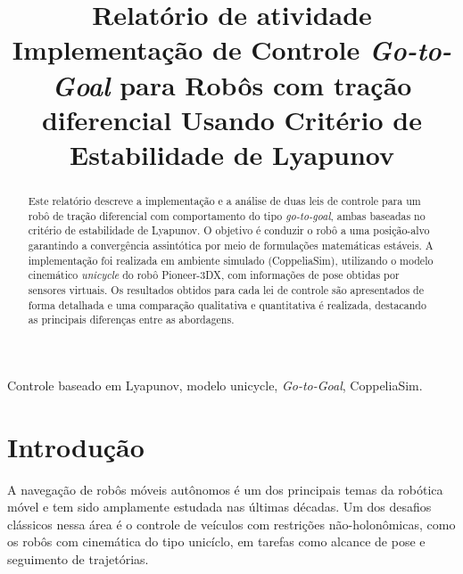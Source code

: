 \documentclass[conference]{IEEEtran}
\begin{document}
\title{Relatório de atividade\\ Implementação de Controle \textit{Go-to-Goal} para Robôs com tração diferencial Usando Critério de Estabilidade de Lyapunov }

\author{
}

\maketitle

\begin{abstract}
Este relatório descreve a implementação e a análise de duas leis de controle para um robô de tração diferencial com comportamento do tipo \textit{go-to-goal}, ambas baseadas no critério de estabilidade de Lyapunov. O objetivo é conduzir o robô a uma posição-alvo garantindo a convergência assintótica por meio de formulações matemáticas estáveis. A implementação foi realizada em ambiente simulado (CoppeliaSim), utilizando o modelo cinemático \textit{unicycle} do robô Pioneer-3DX, com informações de pose obtidas por sensores virtuais. Os resultados obtidos para cada lei de controle são apresentados de forma detalhada e uma comparação qualitativa e quantitativa é realizada, destacando as principais diferenças entre as abordagens.
\end{abstract}


\begin{IEEEkeywords}
Controle baseado em Lyapunov, modelo unicycle, \textit{Go-to-Goal}, CoppeliaSim.
\end{IEEEkeywords}


\section{Introdução}

A navegação de robôs móveis autônomos é um dos principais temas da robótica móvel e tem sido amplamente estudada nas últimas décadas. Um dos desafios clássicos nessa área é o controle de veículos com restrições não-holonômicas, como os robôs com cinemática do tipo unicíclo, em tarefas como alcance de pose e seguimento de trajetórias.
\end{document}
